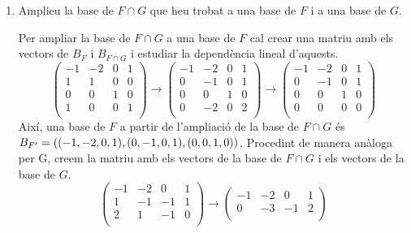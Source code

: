 \documentclass[11pt,a4paper]{article}
\begin{document}
\begin{enumerate}
\begin{enumerate}
        \item Amplieu la base de $F\cap G$ que heu trobat a una base de $F$ i a una base de $G$.\par
        Per ampliar la base de $F\cap G$ a una base de $F$ cal crear una matriu amb els vectors de $B_{F}$ i $B_{F\cap G}$ i estudiar la dependència lineal d'aquests.
        \begin{equation*}
            \begin{pmatrix}
            -1 & -2 & 0 & 1 \\
            1 & 1 & 0 & 0 \\
            0 & 0 & 1 & 0 \\
            1 & 0 & 0 & 1 \\
            \end{pmatrix}\rightarrow
            \begin{pmatrix}
            -1 & -2 & 0 & 1 \\
            0 & -1 & 0 & 1 \\
            0 & 0 & 1 & 0 \\
            0 & -2 & 0 & 2 \\
            \end{pmatrix} \rightarrow
            \begin{pmatrix}
            -1 & -2 & 0 & 1 \\
            0 & -1 & 0 & 1 \\
            0 & 0 & 1 & 0 \\
            0 & 0 & 0 & 0 \\
            \end{pmatrix}
        \end{equation*}
        Així, una base de $F$ a partir de l'ampliació de la base de $F\cap G$ és $B_{F'}=((-1,-2,0,1),(0,-1,0,1),\\(0,0,1,0))$. Procedint de manera anàloga per G, creem la matriu amb els vectors de la base de $F\cap G$ i els vectors de la base de $G$.
        \begin{equation*}
            \begin{pmatrix}
            -1 & -2 & 0 & 1 \\
            1 & -1 & -1 & 1 \\
            2 & 1 & -1 & 0 \\
            \end{pmatrix}\rightarrow
            \begin{pmatrix}
            -1 & -2 & 0 & 1 \\
            0 & -3 & -1 & 2 \\

\end{pmatrix}
\end{equation*}
\end{enumerate}
\end{enumerate}
\end{document}
